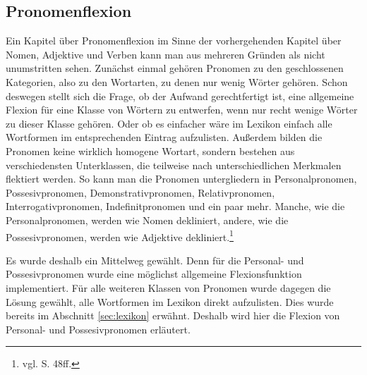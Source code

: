 \subsection{Pronomenflexion}
\label{subsec:pronomen}
Ein Kapitel über Pronomenflexion im Sinne der vorhergehenden Kapitel über Nomen, Adjektive und Verben kann man aus mehreren Gründen als nicht unumstritten sehen. Zunächst einmal gehören Pronomen zu den geschlossenen Kategorien, also zu den Wortarten, zu denen nur wenig Wörter gehören. Schon deswegen stellt sich die Frage, ob der Aufwand gerechtfertigt ist, eine allgemeine Flexion für eine Klasse von Wörtern zu entwerfen, wenn nur recht wenige Wörter zu dieser Klasse gehören. Oder ob es einfacher wäre im Lexikon einfach alle Wortformen im entsprechenden Eintrag aufzulisten. Außerdem bilden die Pronomen keine wirklich homogene Wortart, sondern bestehen aus verschiedensten Unterklassen, die teilweise nach unterschiedlichen Merkmalen flektiert werden. So kann man die Pronomen untergliedern in Personalpronomen, Possesivpronomen, Demonstrativpronomen, Relativpronomen, Interrogativpronomen, Indefinitpronomen und ein paar mehr. Manche, wie die Personalpronomen, werden wie Nomen dekliniert, andere, wie die Possesivpronomen, werden wie Adjektive dekliniert.\footnote{vgl. \cite{BAYER-LINDAUER1994} S. 48ff.} \par
Es wurde deshalb ein Mittelweg gewählt. Denn für die Personal- und Possesivpronomen wurde eine möglichst allgemeine Flexionsfunktion implementiert. Für alle weiteren Klassen von Pronomen wurde dagegen die Lösung gewählt, alle Wortformen im Lexikon direkt aufzulisten. Dies wurde bereits im Abschnitt \ref{sec:lexikon} erwähnt. Deshalb wird hier die Flexion von Personal- und Possesivpronomen erläutert. \par
